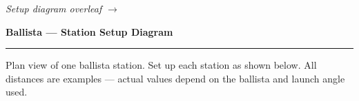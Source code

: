 \documentclass[11pt,a4paper]{article}
\begin{document}
\vfill
\begin{center}
{\footnotesize\itshape\color{RuleGrey} Setup diagram overleaf $\rightarrow$}
\end{center}

\clearpage

{\LARGE\bfseries\color{Ink} Ballista --- Station Setup Diagram}\\[3pt]
{\color{RuleGrey}\rule{\linewidth}{1.2pt}}

\vspace{4pt}
{\color{LineGrey} Plan view of one ballista station. Set up each station as shown below. All distances are
examples --- actual values depend on the ballista and launch angle used.}

\vspace{12pt}
\end{document}
